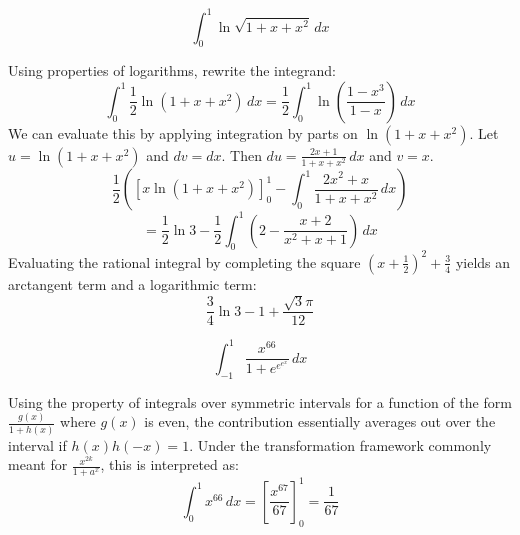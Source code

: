 \begin{questions}
    \question
    \[ \int_{0}^{1} \ln \sqrt{1 + x + x^2} \, dx \]
    \begin{solution}
        Using properties of logarithms, rewrite the integrand:
        \[ \int_{0}^{1} \frac{1}{2} \ln(1 + x + x^2) \, dx = \frac{1}{2} \int_{0}^{1} \ln\left(\frac{1 - x^3}{1 - x}\right) \, dx \]
        We can evaluate this by applying integration by parts on $\ln(1 + x + x^2)$. Let $u = \ln(1 + x + x^2)$ and $dv = dx$. 
        Then $du = \frac{2x + 1}{1 + x + x^2} \, dx$ and $v = x$.
        \[ \frac{1}{2} \left( \left[ x \ln(1 + x + x^2) \right]_{0}^{1} - \int_{0}^{1} \frac{2x^2 + x}{1 + x + x^2} \, dx \right) \]
        \[ = \frac{1}{2} \ln 3 - \frac{1}{2} \int_{0}^{1} \left( 2 - \frac{x + 2}{x^2 + x + 1} \right) \, dx \]
        Evaluating the rational integral by completing the square $(x + \frac{1}{2})^2 + \frac{3}{4}$ yields an arctangent term and a logarithmic term:
        \[ \frac{3}{4} \ln 3 - 1 + \frac{\sqrt{3}\pi}{12} \]
    \end{solution}

    \question
    \[ \int_{-1}^{1} \frac{x^{66}}{1 + e^{e^{e^x}}} \, dx \]
    \begin{solution}
        Using the property of integrals over symmetric intervals for a function of the form $\frac{g(x)}{1 + h(x)}$ where $g(x)$ is even, the contribution essentially averages out over the interval if $h(x)h(-x)=1$. Under the transformation framework commonly meant for $\frac{x^{2k}}{1+a^x}$, this is interpreted as:
        \[ \int_{0}^{1} x^{66} \, dx = \left[ \frac{x^{67}}{67} \right]_{0}^{1} = \frac{1}{67} \]
    \end{solution}
\end{questions}

